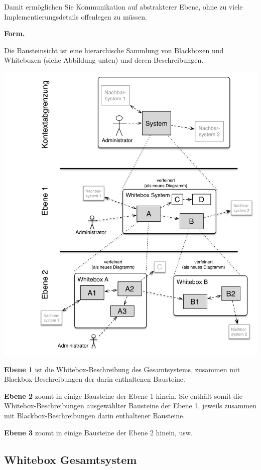 \documentclass[]{article}
\begin{document}
Damit ermöglichen Sie Kommunikation auf abstrakterer Ebene, ohne zu
viele Implementierungsdetails offenlegen zu müssen.

\textbf{Form.}

Die Bausteinsicht ist eine hierarchische Sammlung von Blackboxen und
Whiteboxen (siehe Abbildung unten) und deren Beschreibungen.

\includegraphics{images/05_building_blocks-DE.png}

\textbf{Ebene 1} ist die Whitebox-Beschreibung des Gesamtsystems,
zusammen mit Blackbox-Beschreibungen der darin enthaltenen Bausteine.

\textbf{Ebene 2} zoomt in einige Bausteine der Ebene 1 hinein. Sie
enthält somit die Whitebox-Beschreibungen ausgewählter Bausteine der
Ebene 1, jeweils zusammen mit Blackbox-Beschreibungen darin enthaltener
Bausteine.

\textbf{Ebene 3} zoomt in einige Bausteine der Ebene 2 hinein, usw.

\subsection{Whitebox Gesamtsystem}\label{_whitebox_gesamtsystem}
\end{document}
